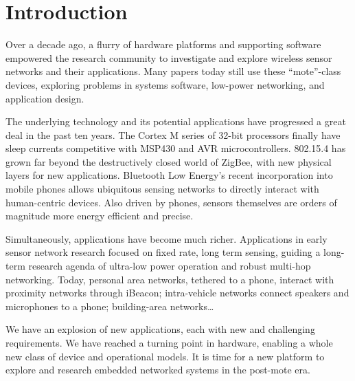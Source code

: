 \section{Introduction}
\label{sec:intro}

Over a decade ago, a flurry of hardware platforms and supporting software
empowered the research community to investigate and explore wireless sensor
networks and their applications. Many papers today still use these
“mote”-class devices, exploring problems in systems software, low-power
networking, and application design. 

The underlying technology and its potential applications have progressed a
great deal in the past ten years. The Cortex M series of 32-bit processors
finally have sleep currents competitive with MSP430 and AVR microcontrollers.
802.15.4 has grown far beyond the destructively closed world of ZigBee, with
new physical layers for new applications. Bluetooth Low Energy’s recent
incorporation into mobile phones allows ubiquitous sensing networks to
directly interact with human-centric devices. Also driven by phones, sensors
themselves are orders of magnitude more energy efficient and precise.

Simultaneously, applications have become much richer. Applications in early
sensor network research focused on fixed rate, long term sensing, guiding a
long-term research agenda of ultra-low power operation and robust multi-hop
networking. Today, personal area networks, tethered to a phone, interact with
proximity networks through iBeacon; intra-vehicle networks connect speakers
and microphones to a phone; building-area networks… 

We have an explosion of new applications, each with new and challenging
requirements. We have reached a turning point in hardware, enabling a whole
new class of device and operational models. It is time for a new platform to
explore and research embedded networked systems in the post-mote era.

